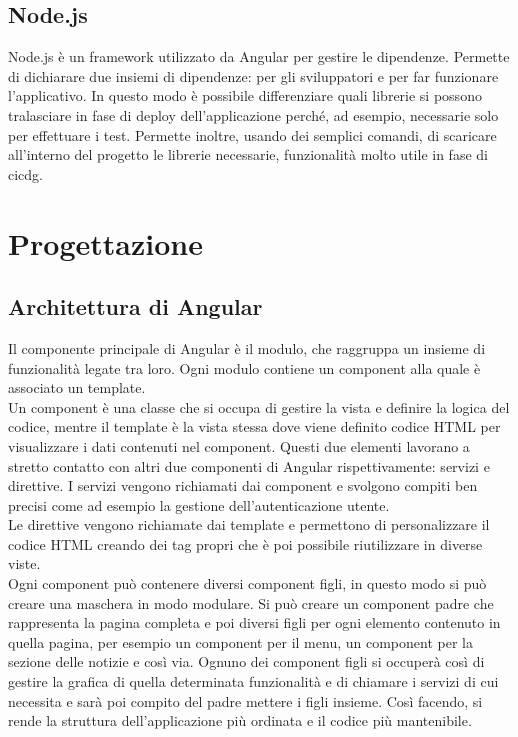 \subsection*{Node.js}
Node.js è un framework utilizzato da Angular per gestire le dipendenze. Permette
di dichiarare due insiemi di dipendenze: per gli sviluppatori e per far funzionare
l’applicativo. In questo modo è possibile differenziare quali librerie si possono tralasciare in fase di deploy dell’applicazione perché, ad esempio, necessarie solo per effettuare i test. Permette inoltre, usando dei semplici comandi, di scaricare all’interno del progetto le librerie necessarie, funzionalità molto utile in fase di \gls{cicdg}\glsfirstoccur.\cite{site:node}

\section{Progettazione}
\label{sec:progettazione}

\subsection{Architettura di Angular}
Il componente principale di Angular è il modulo, che raggruppa un insieme di funzionalità legate tra loro. Ogni modulo contiene un component alla quale è associato un template.\\
Un component è una classe che si occupa di gestire la vista e definire la logica del codice, mentre il template è la vista stessa dove viene definito codice HTML per visualizzare i dati contenuti nel component. Questi due elementi lavorano a stretto contatto con altri due componenti di Angular rispettivamente: servizi e direttive.
I servizi vengono richiamati dai component e svolgono compiti ben precisi come ad esempio la gestione dell’autenticazione utente.\\
Le direttive vengono richiamate dai template e permettono di personalizzare il codice HTML creando dei tag propri che è poi possibile riutilizzare in diverse viste.\\
Ogni component può contenere diversi component figli, in questo modo si può creare una maschera in modo modulare. Si può creare un component padre che rappresenta la pagina completa e poi diversi figli per ogni elemento contenuto in quella pagina,
per esempio un component per il menu, un component per la sezione delle notizie e così via. Ognuno dei component figli si occuperà così di gestire la grafica di quella determinata funzionalità e di chiamare i servizi di cui necessita e sarà poi compito del
padre mettere i figli insieme. Così facendo, si rende la struttura dell’applicazione più ordinata e il codice più mantenibile.

